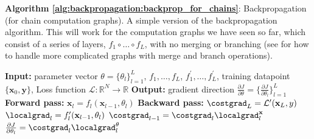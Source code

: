\begin{algorithm}[h]
    \SetAlgoVlined
    \DontPrintSemicolon
    \caption{{\bf Algorithm \ref{alg:backpropagation:backprop_for_chains}}: Backpropagation (for chain computation graphs). A simple version of the backpropagation algorithm. This will work for the computation graphs we have seen so far, which consist of a series of layers, $f_1 \circ \ldots \circ f_L$, with no merging or branching (see \sect{\ref{sec:backpropagation:branch_and_merge}} for how to handle more complicated graphs with merge and branch operations).}
    \fakealgorithmcaption{}
    \label{alg:backpropagation:backprop_for_chains}
    {\bf Input:} parameter vector $\theta = \{\theta_l\}_{l=1}^L$, $f_1, \ldots, f_L$, $f^{\prime}_1, \ldots, f^{\prime}_L$, training datapoint $\{\mathbf{x}_0,\mathbf{y}\}$, Loss function $\mathcal{L}: \mathbb{R}^N \rightarrow \mathbb{R}$\;
    {\bf Output:} gradient direction $\frac{\partial J}{\partial \theta} = \Big\{\frac{\partial J}{\partial \theta_l}\Big\}_{l=1}^L$ \;
    \;
    \textbf{Forward pass:}\;
     {
        $\mathbf{x}_l = f_l(\mathbf{x}_{l-1}, \theta_l)$\;
    }
    \;
    \textbf{Backward pass:}\;
    $\costgrad_L = \mathcal{L}^{\prime}(\mathbf{x}_L,y)$\;
     {
    $\localgrad_{l} = f_l^{\prime}(\mathbf{x}_{l-1},\theta_l)$\;
    $\costgrad_{l-1} = \costgrad_{l}\localgrad^{\mathbf{x}}_{l}$\;
    $\frac{\partial J}{\partial \theta_l} = \costgrad_{l}\localgrad^{\theta}_{l}$\;
    }
\end{algorithm}

